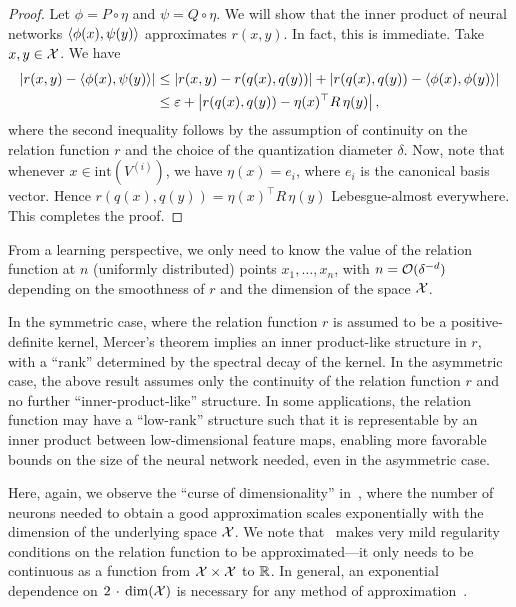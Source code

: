\begin{proof}
    Let $\phi = P \circ \eta$ and $\psi = Q \circ \eta$. We will show that the inner product of neural networks $\left \langle \phi(x), \psi(y) \right\rangle$ approximates $r(x, y)$. In fact, this is immediate. Take $x, y \in {\mathcal{X}}$. We have
    \begin{align*}
        \abs{r(x, y) - \iprod{\phi(x)}{\psi(y)}} &\leq \abs{r(x, y) - r(q(x), q(y))} + \abs{r(q(x), q(y)) - \iprod{\phi(x)}{\phi(y)}}\\
        &\leq \epsilon + \abs{r(q(x), q(y)) - \eta(x)^\top R\, \eta(y)},
    \end{align*}
    where the second inequality follows by the assumption of continuity on the relation function $r$ and the choice of the quantization diameter $\delta$. Now, note that whenever $x \in \mathrm{int}(V^{(i)})$, we have $\eta(x) = e_i$, where $e_i$ is the canonical basis vector. Hence $r(q(x), q(y)) = \eta(x)^\top R\, \eta(y)$ Lebesgue-almost everywhere. This completes the proof.
\end{proof}

\begin{remark}
    From a learning perspective, we only need to know the value of the relation function at $n$ (uniformly distributed) points $x_1, \ldots, x_n$, with $n = {\mathcal{O}}(\delta^{-d})$ depending on the smoothness of $r$ and the dimension of the space ${\mathcal{X}}$.
\end{remark}

\begin{remark}
    In the symmetric case, where the relation function $r$ is assumed to be a positive-definite kernel, Mercer's theorem implies an inner product-like structure in $r$, with a ``rank'' determined by the spectral decay of the kernel. In the asymmetric case, the above result assumes only the continuity of the relation function $r$ and no further ``inner-product-like'' structure. In some applications, the relation function may have a ``low-rank'' structure such that it is representable by an inner product between low-dimensional feature maps, enabling more favorable bounds on the size of the neural network needed, even in the asymmetric case.
\end{remark}

Here, again, we observe the ``curse of dimensionality'' in~, where the number of neurons needed to obtain a good approximation scales exponentially with the dimension of the underlying space ${\mathcal{X}}$. We note that~ makes very mild regularity conditions on the relation function to be approximated---it only needs to be continuous as a function from ${\mathcal{X}} \times {\mathcal{X}}$ to $\mathbb{R}$. In general, an exponential dependence on $2\,\cdot\, \dim({\mathcal{X}})$ is necessary for any method of approximation~\citep{pinkus1999approximation,devore1998nonlinear,maiorov1999lower,maiorov2000near,poggioWhyWhenCan2017}.

